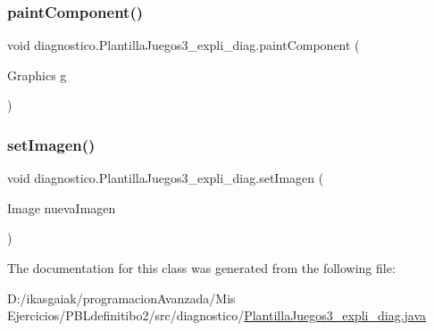 \mbox{\label{classdiagnostico_1_1_plantilla_juegos3__expli__diag_a0fb3f55a74d04109b29485083d4ce091}} 
\subsubsection{\texorpdfstring{paint\+Component()}{paintComponent()}}
{\footnotesize\ttfamily void diagnostico.\+Plantilla\+Juegos3\+\_\+expli\+\_\+diag.\+paint\+Component (\begin{DoxyParamCaption}\item[{Graphics}]{g }\end{DoxyParamCaption})\hspace{0.3cm}{\ttfamily [protected]}}

\mbox{\label{classdiagnostico_1_1_plantilla_juegos3__expli__diag_a1d613bb5b504823f4d8cffbbb1ec51b5}} 
\subsubsection{\texorpdfstring{set\+Imagen()}{setImagen()}}
{\footnotesize\ttfamily void diagnostico.\+Plantilla\+Juegos3\+\_\+expli\+\_\+diag.\+set\+Imagen (\begin{DoxyParamCaption}\item[{Image}]{nueva\+Imagen }\end{DoxyParamCaption})}



The documentation for this class was generated from the following file\+:\begin{DoxyCompactItemize}
\item 
D\+:/ikasgaiak/programacion\+Avanzada/\+Mis Ejercicios/\+P\+B\+Ldefinitibo2/src/diagnostico/\mbox{\hyperlink{_plantilla_juegos3__expli__diag_8java}{Plantilla\+Juegos3\+\_\+expli\+\_\+diag.\+java}}\end{DoxyCompactItemize}
